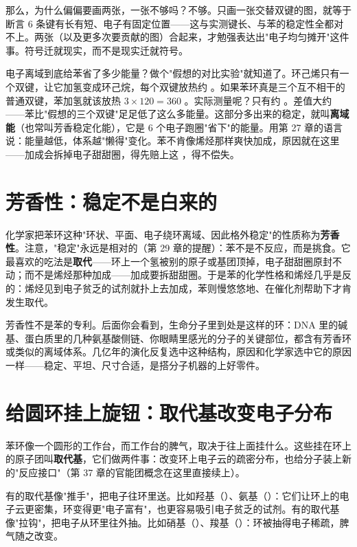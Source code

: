 那么，为什么偏偏要画两张，一张不够吗？不够。只画一张交替双键的图，就等于断言 6 条键有长有短、电子有固定位置——这与实测键长、与苯的稳定性全都对不上。两张（以及更多次要贡献的图）合起来，才勉强表达出"电子均匀摊开"这件事。符号迁就现实，而不是现实迁就符号。

\begin{qiaoliang}
电子离域到底给苯省了多少能量？做个"假想的对比实验"就知道了。环己烯只有一个双键，让它加氢变成环己烷，每个双键放热约 。如果苯环真是三个互不相干的普通双键，苯加氢就该放热 $3\times 120=360$ 。实际测量呢？只有约 。差值大约 ——苯比"假想的三个双键"足足低了这么多能量。这部分多出来的稳定，就叫\textbf{离域能}（也常叫芳香稳定化能），它是 6 个电子跑圈"省下"的能量。用第 27 章的语言说：能量越低，体系越"懒得"变化。苯不肯像烯烃那样爽快加成，原因就在这里——加成会拆掉电子甜甜圈，得先赔上这 ，得不偿失。
\end{qiaoliang}

\section{芳香性：稳定不是白来的}

化学家把苯环这种"环状、平面、电子绕环离域、因此格外稳定"的性质称为\textbf{芳香性}。注意，"稳定"永远是相对的（第 29 章的提醒）：苯不是不反应，而是挑食。它最喜欢的吃法是\textbf{取代}——环上一个氢被别的原子或基团顶掉，电子甜甜圈原封不动；而不是烯烃那种加成——加成要拆甜甜圈。于是苯的化学性格和烯烃几乎是反的：烯烃见到电子贫乏的试剂就扑上去加成，苯则慢悠悠地、在催化剂帮助下才肯发生取代。

芳香性不是苯的专利。后面你会看到，生命分子里到处是这样的环：DNA 里的碱基、蛋白质里的几种氨基酸侧链、你眼睛里感光的分子的关键部位，都含有芳香环或类似的离域体系。几亿年的演化反复选中这种结构，原因和化学家选中它的原因一样——稳定、平坦、尺寸合适，是搭分子机器的上好零件。

\section{给圆环挂上旋钮：取代基改变电子分布}

苯环像一个圆形的工作台，而工作台的脾气，取决于往上面挂什么。这些挂在环上的原子团叫\textbf{取代基}，它们做两件事：改变环上电子云的疏密分布，也给分子装上新的"反应接口"（第 37 章的官能团概念在这里直接续上）。

有的取代基像"推手"，把电子往环里送。比如羟基（）、氨基（）：它们让环上的电子云更密集，环变得更"电子富有"，也更容易吸引电子贫乏的试剂。有的取代基像"拉钩"，把电子从环里往外抽。比如硝基（）、羧基（）：环被抽得电子稀疏，脾气随之改变。

